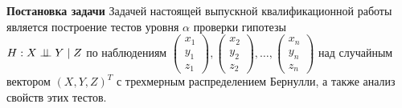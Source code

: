 
\textbf{Постановка задачи} \quad
Задачей настоящей выпускной квалификационной работы 
является построение тестов уровня $\alpha$ 
проверки гипотезы \\ $H: X \perp\!\!\!\perp Y \mid Z$
по наблюдениям
$
\begin{pmatrix}
    x_1 \\
    y_1 \\
    z_1
\end{pmatrix},
\begin{pmatrix}
    x_2 \\
    y_2 \\
    z_2
\end{pmatrix}, \ldots,
\begin{pmatrix}
    x_n \\
    y_n \\
    z_n
\end{pmatrix}
$ над случайным вектором $(X,Y,Z)^T$ с
трехмерным распределением Бернулли, а также
анализ свойств этих тестов.
